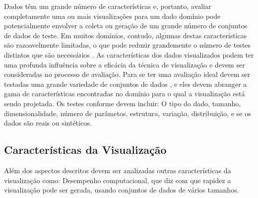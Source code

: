 Dados têm um grande número de características e, portanto, avaliar completamente uma ou mais visualizações para um dado domínio pode potencialmente envolver a coleta ou geração de um grande número de conjuntos de dados de teste. Em muitos domínios, contudo, algumas destas características são razoavelmente limitadas, o que pode reduzir grandemente o número de testes distintos que são necessários \cite{ward2015interactive}. As características dos dados visualizados podem ter uma profunda influência sobre a eficácia da técnica de visualização e devem ser consideradas no processo de avaliação. Para se ter uma avaliação ideal devem ser testadas uma grande variedade de conjuntos de dados , e eles devem abranger a gama de características encontradas no domínio para o qual a visualização está sendo projetada. Os testes conforme \cite{ward2015interactive} devem incluir: O tipo do dado, tamanho, dimensionalidade, número de parâmetos, estrutura, variação, distribuição, e se os dados são reais ou sintéticos.


\subsection{Características da Visualização}

Além dos aspectos descritos devem ser analizadas outras características da visualização como: 
Desempenho computacional,  que diz com que rapidez a visualização pode ser gerada, usando conjuntos de dados de vários tamanhos.





